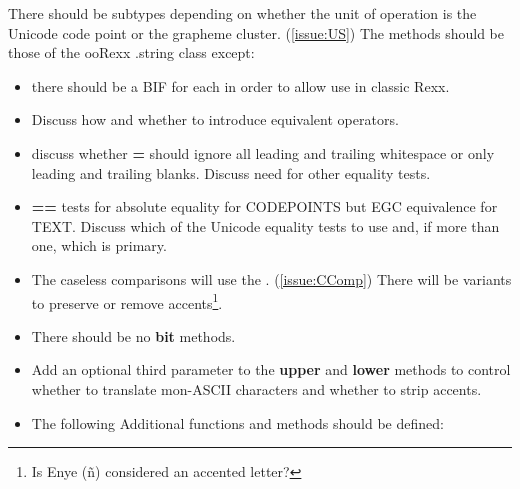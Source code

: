 \documentclass[b4paper]{article}
\begin{document}
There should be subtypes depending on whether the
unit of operation is the Unicode code point or the grapheme cluster. (\cref{issue:US})
The methods should be those of the ooRexx .string class except:
\begin{itemize}
\item there should be a BIF for each in order to allow use in classic Rexx.
\item Discuss how and whether to introduce equivalent operators.
\item discuss whether \textbf{=} should ignore all leading and trailing whitespace
or only leading and trailing blanks. Discuss need for other equality tests.
\item \textbf{==} tests for absolute equality for CODEPOINTS but
EGC equivalence for TEXT.
Discuss which of the Unicode equality tests to use and,
if more than one, which is primary.
\item
The caseless comparisons will use the \cite{UCD}.
(\cref{issue:CComp})
There will be variants to preserve or remove accents\footnote{Is Enye (\~n) considered an accented letter?}.
\item There should be no \textbf{bit\textellipsis} methods.
\item Add an optional third parameter to the \textbf{upper} and \textbf{lower} methods
to control whether to translate mon-ASCII characters and whether to strip accents.
\item
The following Additional functions and methods should be defined:
\end{itemize}
\end{document}

